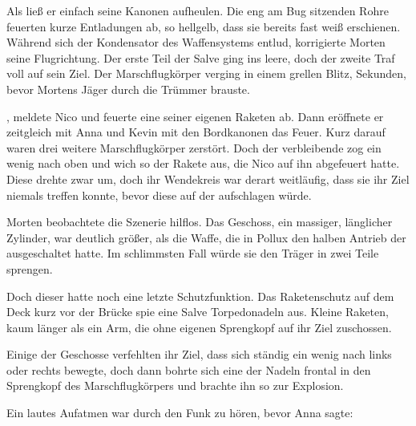 \par

Als ließ er einfach seine Kanonen aufheulen. Die eng am Bug sitzenden Rohre feuerten kurze Entladungen ab, so hellgelb, dass sie bereits fast weiß erschienen. Während sich der Kondensator des Waffensystems entlud, korrigierte Morten seine Flugrichtung. Der erste Teil der Salve ging ins leere, doch der zweite Traf voll auf sein Ziel. Der Marschflugkörper verging in einem grellen Blitz, Sekunden, bevor Mortens Jäger durch die Trümmer brauste.

\par

, meldete Nico und feuerte eine seiner eigenen Raketen ab. Dann eröffnete er zeitgleich mit Anna und Kevin mit den Bordkanonen das Feuer. Kurz darauf waren drei weitere Marschflugkörper zerstört. Doch der verbleibende zog ein wenig nach oben und wich so der Rakete aus, die Nico auf ihn abgefeuert hatte. Diese drehte zwar um, doch ihr Wendekreis war derart weitläufig, dass sie ihr Ziel niemals treffen konnte, bevor diese auf der  aufschlagen würde.

\par

Morten beobachtete die Szenerie hilflos. Das Geschoss, ein massiger, länglicher Zylinder, war deutlich größer, als die Waffe, die in Pollux den halben Antrieb der  ausgeschaltet hatte. Im schlimmsten Fall würde sie den Träger in zwei Teile sprengen.

\par

Doch dieser hatte noch eine letzte Schutzfunktion. Das Raketenschutz auf dem Deck kurz vor der Brücke spie eine Salve Torpedonadeln aus. Kleine Raketen, kaum länger als ein Arm, die ohne eigenen Sprengkopf auf ihr Ziel zuschossen.

\par

Einige der Geschosse verfehlten ihr Ziel, dass sich ständig ein wenig nach links oder rechts bewegte, doch dann bohrte sich eine der Nadeln frontal in den Sprengkopf des Marschflugkörpers und brachte ihn so zur Explosion.

\par

Ein lautes Aufatmen war durch den Funk zu hören, bevor Anna sagte: 

\par

